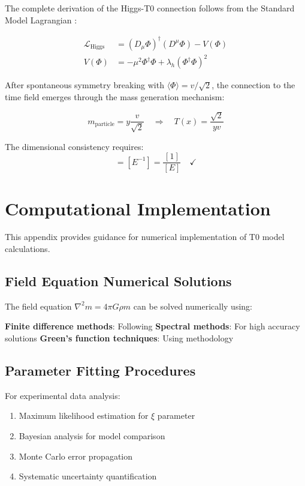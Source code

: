 \documentclass[12pt,a4paper]{article}
\begin{document}
	The complete derivation of the Higgs-T0 connection follows from the Standard Model Lagrangian \citep{weinberg2003,peskin1995}:
	
	\begin{align}
		\mathcal{L}_{\text{Higgs}} &= (D_\mu \Phi)^\dagger (D^\mu \Phi) - V(\Phi) \\
		V(\Phi) &= -\mu^2 \Phi^\dagger \Phi + \lambda_h (\Phi^\dagger \Phi)^2
	\end{align}
	
	After spontaneous symmetry breaking with $\langle\Phi\rangle = v/\sqrt{2}$, the connection to the time field emerges through the mass generation mechanism:
	
	\begin{equation}
		m_{\text{particle}} = y \frac{v}{\sqrt{2}} \quad \Rightarrow \quad T(x) = \frac{\sqrt{2}}{y v}
	\end{equation}
	
	The dimensional consistency requires:
	\begin{equation}
		[T(x)] = [E^{-1}] = \frac{[1]}{[E]} \quad \checkmark
	\end{equation}
	

	\section{Computational Implementation}
	\label{app:computational}
	
	This appendix provides guidance for numerical implementation of T0 model calculations.
	
	\subsection{Field Equation Numerical Solutions}
	\label{app:numerical_solutions}
	
	The field equation $\nabla^2 m = 4\pi G \rho m$ can be solved numerically using:
	
	\textbf{Finite difference methods}: Following \citet{haberman2004}
	\textbf{Spectral methods}: For high accuracy solutions
	\textbf{Green's function techniques}: Using \citet{duffy2001} methodology
	
	\subsection{Parameter Fitting Procedures}
	\label{app:parameter_fitting}
	
	For experimental data analysis:
	\begin{enumerate}
		\item Maximum likelihood estimation for $\xi$ parameter
		\item Bayesian analysis for model comparison
		\item Monte Carlo error propagation
		\item Systematic uncertainty quantification
	\end{enumerate}
	
\end{document}

